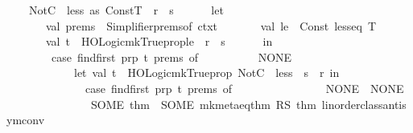 \begin{isabellebody}
\ \ \ \ NotC\ {\isachardollar}{\kern0pt}\ {\isacharparenleft}{\kern0pt}{\isacharparenleft}{\kern0pt}less\ as\ Const{\isacharparenleft}{\kern0pt}{\isacharunderscore}{\kern0pt}{\isacharcomma}{\kern0pt}T{\isacharparenright}{\kern0pt}{\isacharparenright}{\kern0pt}\ {\isachardollar}{\kern0pt}\ r\ {\isachardollar}{\kern0pt}\ s{\isacharparenright}{\kern0pt}\ {\isacharequal}{\kern0pt}{\isachargreater}{\kern0pt}\isanewline
\ \ \ \ \ {\isacharparenleft}{\kern0pt}let\isanewline
\ \ \ \ \ \ \ val\ prems\ {\isacharequal}{\kern0pt}\ Simplifier{\isachardot}{\kern0pt}prems{\isacharunderscore}{\kern0pt}of\ ctxt{\isacharsemicolon}{\kern0pt}\isanewline
\ \ \ \ \ \ \ val\ le\ {\isacharequal}{\kern0pt}\ Const\ {\isacharparenleft}{\kern0pt}\isactrlconstUNDERSCOREname {\isasymopen}less{\isacharunderscore}{\kern0pt}eq{\isasymclose}{\isacharcomma}{\kern0pt}\ T{\isacharparenright}{\kern0pt}{\isacharsemicolon}{\kern0pt}\isanewline
\ \ \ \ \ \ \ val\ t\ {\isacharequal}{\kern0pt}\ HOLogic{\isachardot}{\kern0pt}mk{\isacharunderscore}{\kern0pt}Trueprop{\isacharparenleft}{\kern0pt}le\ {\isachardollar}{\kern0pt}\ r\ {\isachardollar}{\kern0pt}\ s{\isacharparenright}{\kern0pt}{\isacharsemicolon}{\kern0pt}\isanewline
\ \ \ \ \ \ in\isanewline
\ \ \ \ \ \ \ \ {\isacharparenleft}{\kern0pt}case\ find{\isacharunderscore}{\kern0pt}first\ {\isacharparenleft}{\kern0pt}prp\ t{\isacharparenright}{\kern0pt}\ prems\ of\isanewline
\ \ \ \ \ \ \ \ \ \ NONE\ {\isacharequal}{\kern0pt}{\isachargreater}{\kern0pt}\isanewline
\ \ \ \ \ \ \ \ \ \ \ \ let\ val\ t\ {\isacharequal}{\kern0pt}\ HOLogic{\isachardot}{\kern0pt}mk{\isacharunderscore}{\kern0pt}Trueprop\ {\isacharparenleft}{\kern0pt}NotC\ {\isachardollar}{\kern0pt}\ {\isacharparenleft}{\kern0pt}less\ {\isachardollar}{\kern0pt}\ s\ {\isachardollar}{\kern0pt}\ r{\isacharparenright}{\kern0pt}{\isacharparenright}{\kern0pt}\ in\isanewline
\ \ \ \ \ \ \ \ \ \ \ \ \ \ {\isacharparenleft}{\kern0pt}case\ find{\isacharunderscore}{\kern0pt}first\ {\isacharparenleft}{\kern0pt}prp\ t{\isacharparenright}{\kern0pt}\ prems\ of\isanewline
\ \ \ \ \ \ \ \ \ \ \ \ \ \ \ \ NONE\ {\isacharequal}{\kern0pt}{\isachargreater}{\kern0pt}\ NONE\isanewline
\ \ \ \ \ \ \ \ \ \ \ \ \ \ {\isacharbar}{\kern0pt}\ SOME\ thm\ {\isacharequal}{\kern0pt}{\isachargreater}{\kern0pt}\ SOME\ {\isacharparenleft}{\kern0pt}mk{\isacharunderscore}{\kern0pt}meta{\isacharunderscore}{\kern0pt}eq{\isacharparenleft}{\kern0pt}thm\ RS\ {\isacharat}{\kern0pt}{\isacharbraceleft}{\kern0pt}thm\ linorder{\isacharunderscore}{\kern0pt}class{\isachardot}{\kern0pt}antisym{\isacharunderscore}{\kern0pt}conv{}{\isacharbraceright}{\kern0pt}{\isacharparenright}{\kern0pt}{\isacharparenright}{\kern0pt}{\isacharparenright}{\kern0pt}\isanewline

\end{isabellebody}

